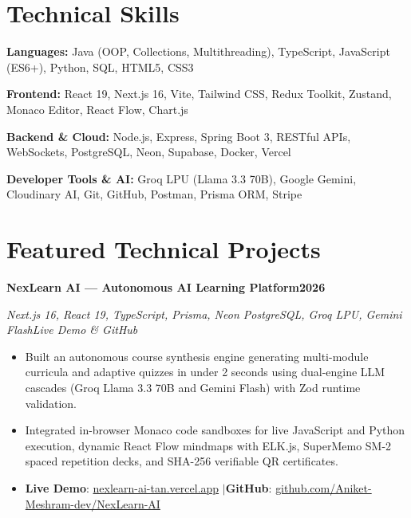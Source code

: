 \documentclass[letterpaper,10pt]{article}
\newcommand{\resumeItemListStart}{\begin{itemize}[leftmargin=0.18in, topsep=1.5pt, itemsep=2.0pt, parsep=0pt]}
\newcommand{\resumeItemListEnd}{\end{itemize}\vspace{3pt}}
\newcommand{\resumeHeading}[2]{%
  \noindent\textbf{#1}\hfill\textbf{#2}\par
}
\newcommand{\resumeSubHeading}[2]{%
  \noindent\textit{#1}\hfill\textit{#2}\par
}
\newcommand{\sep}{\hspace{3pt}$|$\hspace{3pt}}
\begin{document}
\section{Technical Skills}
\textbf{Languages:} Java (OOP, Collections, Multithreading), TypeScript, JavaScript (ES6+), Python, SQL, HTML5, CSS3 \par
\vspace{2pt}
\textbf{Frontend:} React 19, Next.js 16, Vite, Tailwind CSS, Redux Toolkit, Zustand, Monaco Editor, React Flow, Chart.js \par
\vspace{2pt}
\textbf{Backend \& Cloud:} Node.js, Express, Spring Boot 3, RESTful APIs, WebSockets, PostgreSQL, Neon, Supabase, Docker, Vercel \par
\vspace{2pt}
\textbf{Developer Tools \& AI:} Groq LPU (Llama 3.3 70B), Google Gemini, Cloudinary AI, Git, GitHub, Postman, Prisma ORM, Stripe

\section{Featured Technical Projects}

\resumeHeading{NexLearn AI --- Autonomous AI Learning Platform}{2026}
\resumeSubHeading{Next.js 16, React 19, TypeScript, Prisma, Neon PostgreSQL, Groq LPU, Gemini Flash}{Live Demo \& GitHub}
\resumeItemListStart
  \item Built an autonomous course synthesis engine generating multi-module curricula and adaptive quizzes in under 2 seconds using dual-engine LLM cascades (Groq Llama 3.3 70B and Gemini Flash) with Zod runtime validation.
  \item Integrated in-browser Monaco code sandboxes for live JavaScript and Python execution, dynamic React Flow mindmaps with ELK.js, SuperMemo SM-2 spaced repetition decks, and SHA-256 verifiable QR certificates.
  \item \textbf{Live Demo}: \href{https://nexlearn-ai-tan.vercel.app/}{\faExternalLinkAlt\hspace{2pt}nexlearn-ai-tan.vercel.app} \sep \textbf{GitHub}: \href{https://github.com/Aniket-Meshram-dev/NexLearn-AI}{\faGithub\hspace{2pt}github.com/Aniket-Meshram-dev/NexLearn-AI}
\resumeItemListEnd
\vspace{2pt}
\end{document}
